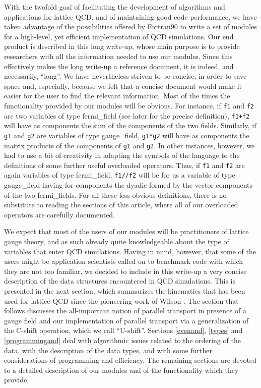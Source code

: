 With the twofold goal of facilitating the development of algorithms
and applications for lattice QCD,
and of maintaining good code performance, we have taken advantage of
the possibilities offered by Fortran90 to write a set of modules for
a high-level, yet efficient implementation of QCD simulations.
Our end product is described in this long write-up, whose main
purpose is to provide researchers with all the information needed
to use our modules.  Since this effectively makes the long write-up
a reference document, it is indeed, and necessarily, ``long''.
We have nevertheless striven to be concise, in order to save space
and, especially, because we felt that a concise document would make it
easier for the user to find the relevant information.  Most of the
times the functionality provided by our modules will be obvious.
For instance, if {\tt f1} and {\tt f2} are two variables of type
fermi\_field (see later for the precise definition), {\tt f1+f2}
will have as components the sum of the components of the two fields.
Similarly, if {\tt g1} and {\tt g2} are variables of type gauge\_field,
{\tt g1*g2} will have as components the matrix products of the components
of {\tt g1} and {\tt g2}. In other
instances, however, we had to use a bit of creativity in adapting
the symbols of the language to the definitions of some further useful 
overloaded operators.  Thus, if {\tt f1} and {\tt f2} are again variables 
of type fermi\_field, {\tt f1//f2} will be for us a variable of 
type gauge\_field having for components the dyadic formed by the 
vector components of the two fermi\_fields.  For all these less
obvious definitions, there is no substitute to reading the
sections of this article, where all of our overloaded operators
are carefully documented.  

We expect that most of the users of our modules will be practitioners of
lattice gauge theory, and as such already quite knowledgeable about 
the type of variables that enter QCD simulations.  
Having in mind, however, that some of the
users might be application scientists called on to benchmark code
with which they are not too familiar, we decided to include in this
write-up a very concise description of the data structures encountered in
QCD simulations.  This is presented in the next section, which summarizes
the kinematics that has been used for lattice QCD since the pioneering 
work of Wilson \cite{wilson}.  The section that follows discusses
the all-important notion of parallel transport in presence of a gauge
field and our implementation of parallel transport via a generalization
of the C-shift operation, which we call ``U-shift''.  Sections \ref{evenand},
\ref{types} and \ref{programmingand} deal with algorithmic issues related 
to the ordering of the data, with the description of the data types,
and with some further considerations of programming and efficiency.
The remaining sections are devoted to a detailed description of
our modules and of the functionality which they provide. 

